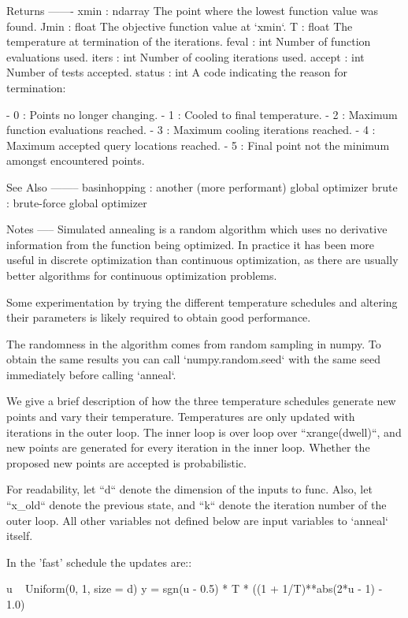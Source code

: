 \begin{DoxyVerb}
Returns
-------
xmin : ndarray
    The point where the lowest function value was found.
Jmin : float
    The objective function value at `xmin`.
T : float
    The temperature at termination of the iterations.
feval : int
    Number of function evaluations used.
iters : int
    Number of cooling iterations used.
accept : int
    Number of tests accepted.
status : int
    A code indicating the reason for termination:

    - 0 : Points no longer changing.
    - 1 : Cooled to final temperature.
    - 2 : Maximum function evaluations reached.
    - 3 : Maximum cooling iterations reached.
    - 4 : Maximum accepted query locations reached.
    - 5 : Final point not the minimum amongst encountered points.

See Also
--------
basinhopping : another (more performant) global optimizer
brute : brute-force global optimizer

Notes
-----
Simulated annealing is a random algorithm which uses no derivative
information from the function being optimized. In practice it has
been more useful in discrete optimization than continuous
optimization, as there are usually better algorithms for continuous
optimization problems.

Some experimentation by trying the different temperature
schedules and altering their parameters is likely required to
obtain good performance.

The randomness in the algorithm comes from random sampling in numpy.
To obtain the same results you can call `numpy.random.seed` with the
same seed immediately before calling `anneal`.

We give a brief description of how the three temperature schedules
generate new points and vary their temperature.  Temperatures are
only updated with iterations in the outer loop.  The inner loop is
over loop over ``xrange(dwell)``, and new points are generated for
every iteration in the inner loop.  Whether the proposed new points
are accepted is probabilistic.

For readability, let ``d`` denote the dimension of the inputs to func.
Also, let ``x_old`` denote the previous state, and ``k`` denote the
iteration number of the outer loop.  All other variables not
defined below are input variables to `anneal` itself.

In the 'fast' schedule the updates are::

    u ~ Uniform(0, 1, size = d)
    y = sgn(u - 0.5) * T * ((1 + 1/T)**abs(2*u - 1) - 1.0)


\end{DoxyVerb}
